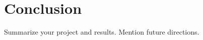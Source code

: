 \chapter{Conclusion}
\label{chp:conc}

Summarize your project and results. Mention future directions.